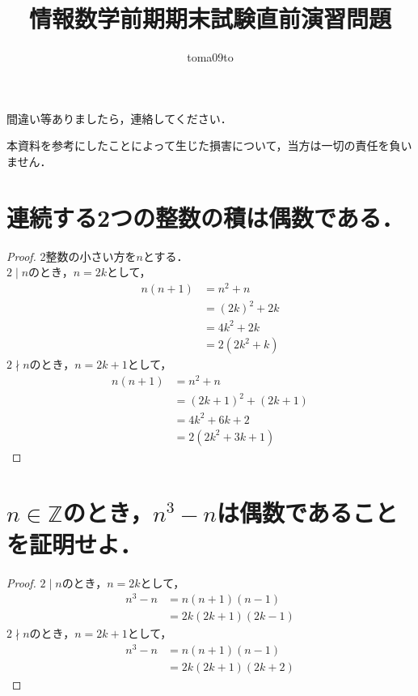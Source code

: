 \documentclass[a4paper,12pt]{ltjsarticle}
\title{情報数学前期期末試験直前演習問題}
\author{toma09to}
\date{}
\newcommand{\Z}{\mathbb{Z}}
\begin{document}
\setcounter{section}{-1}
\maketitle

間違い等ありましたら，連絡してください．

本資料を参考にしたことによって生じた損害について，当方は一切の責任を負いません．

\section{連続する2つの整数の積は偶数である．}
\begin{proof}
    2整数の小さい方を$n$とする． \\
    $2 \mid n$のとき，$n = 2k$として，
    \begin{align*}
        n(n+1) &= n^2 + n \\
               &= (2k)^2 + 2k \\
               &= 4k^2 + 2k \\
               &= 2(2k^2 + k)
    \end{align*}
    $2 \nmid n$のとき，$n = 2k + 1$として，
    \begin{align*}
        n(n+1) &= n^2 + n \\
               &= (2k + 1)^2 + (2k + 1) \\
               &= 4k^2 + 6k + 2 \\
               &= 2(2k^2 + 3k + 1)
    \end{align*}
\end{proof}

\section{$n \in \Z$のとき，$n^3 - n$は偶数であることを証明せよ．}
\begin{proof}
    $2 \mid n$のとき，$n = 2k$として，
    \begin{align*}
        n^3 - n &= n(n + 1)(n - 1) \\
                &= 2k(2k + 1)(2k - 1)
    \end{align*}
    $2 \nmid n$のとき，$n = 2k + 1$として，
    \begin{align*}
        n^3 - n &= n(n + 1)(n - 1) \\
                &= 2k(2k + 1)(2k + 2)
    \end{align*}
\end{proof}
\end{document}
